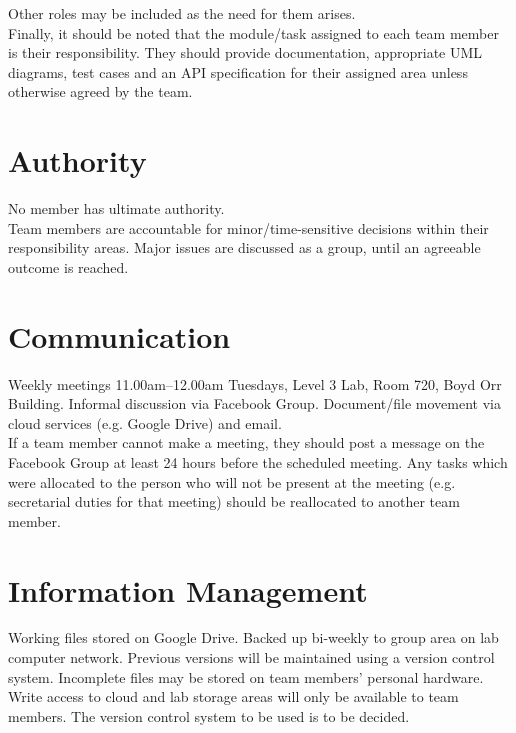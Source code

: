 \documentclass{l3deliverable}
\begin{document}
Other roles may be included as the need for them arises.\\

Finally, it should be noted that the module/task assigned to each team member is their responsibility. They should provide documentation, appropriate UML diagrams, test cases and an API specification for their assigned area unless otherwise agreed by the team. 



\section{Authority}

No member has ultimate authority. \\
Team members are accountable for minor/time-sensitive decisions within their responsibility areas.
Major issues are discussed as a group, until an agreeable outcome is reached.


\section{Communication}

Weekly meetings 11.00am–12.00am Tuesdays, Level 3 Lab, Room 720, Boyd Orr Building.
Informal discussion via Facebook Group.
Document/file movement via cloud services (e.g. Google Drive) and email.
\\
If a team member cannot make a meeting, they should post a message on the Facebook Group at least 24 hours before the scheduled meeting. Any tasks which were allocated to the person who will not be present at the meeting (e.g. secretarial duties for that meeting) should be reallocated to another team member.


\section{Information Management}

Working files stored on Google Drive. Backed up bi-weekly to group area on lab computer network. Previous versions will be maintained using a version control system. Incomplete files may be stored on team members' personal hardware.
Write access to cloud and lab storage areas will only be available to team members.
The version control system to be used is to be decided. 
\end{document}
